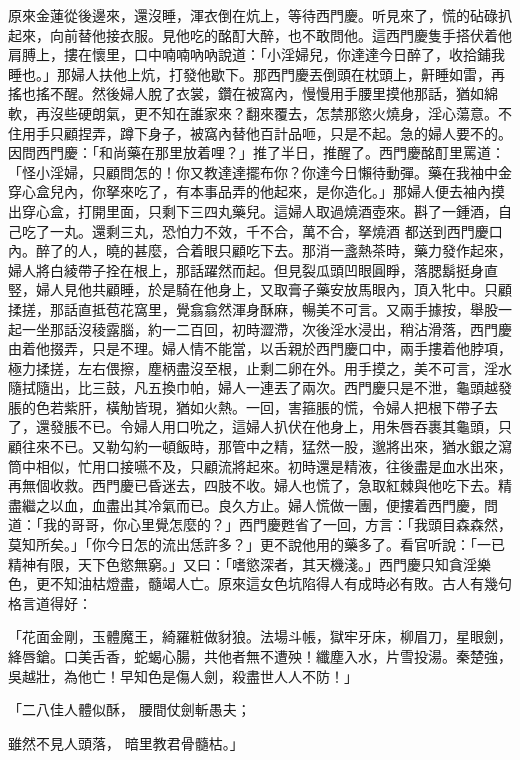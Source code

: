 \begin{showcontents}{}
原來金蓮從後邊來，還沒睡，渾衣倒在炕上，等待西門慶。听見來了，慌的砧碌扒起來，向前替他接衣服。見他吃的酩酊大醉，也不敢問他。這西門慶隻手搭伏着他肩膊上，摟在懷里，口中喃喃吶吶說道：「小淫婦兒，你達達今日醉了，收拾鋪我睡也。」那婦人扶他上炕，打發他歇下。那西門慶丟倒頭在枕頭上，鼾睡如雷，再搖也搖不醒。然後婦人脫了衣裳，鑽在被窩內，慢慢用手腰里摸他那話，猶如綿軟，再沒些硬朗氣，更不知在誰家來？翻來覆去，怎禁那慾火燒身，淫心蕩意。不住用手只顧捏弄，蹲下身子，被窩內替他百計品咂，只是不起。急的婦人要不的。因問西門慶：「和尚藥在那里放着哩？」推了半日，推醒了。西門慶酩酊里罵道：「怪小淫婦，只顧問怎的！你又教達達擺布你？你達今日懶待動彈。藥在我袖中金穿心盒兒內，你拏來吃了，有本事品弄的他起來，是你造化。」那婦人便去袖內摸出穿心盒，打開里面，只剩下三四丸藥兒。這婦人取過燒酒壺來。斟了一鍾酒，自己吃了一丸。還剩三丸，恐怕力不效，千不合，萬不合，拏燒酒 都送到西門慶口內。醉了的人，曉的甚麼，合着眼只顧吃下去。那消一盞熱茶時，藥力發作起來，婦人將白綾帶子拴在根上，那話躍然而起。但見裂瓜頭凹眼圓睜，落腮鬍挺身直竪，婦人見他共顧睡，於是騎在他身上，又取膏子藥安放馬眼內，頂入牝中。只顧揉搓，那話直抵苞花窩里，覺翕翕然渾身酥麻，暢美不可言。又兩手據按，舉股一起一坐那話沒稜露腦，約一二百回，初時澀滯，次後淫水浸出，稍沾滑落，西門慶由着他掇弄，只是不理。婦人情不能當，以舌親於西門慶口中，兩手摟着他脖項，極力揉搓，左右偎擦，塵柄盡沒至根，止剩二卵在外。用手摸之，美不可言，淫水隨拭隨出，比三鼓，凡五換巾帕，婦人一連丟了兩次。西門慶只是不泄，龜頭越發脹的色若紫肝，橫觔皆現，猶如火熱。一回，害箍脹的慌，令婦人把根下帶子去了，還發脹不已。令婦人用口吮之，這婦人扒伏在他身上，用朱唇吞裹其龜頭，只顧往來不已。又勒勾約一頓飯時，那管中之精，猛然一股，邈將出來，猶水銀之瀉筒中相似，忙用口接嚥不及，只顧流將起來。初時還是精液，往後盡是血水出來，再無個收救。西門慶已昏迷去，四肢不收。婦人也慌了，急取紅棘與他吃下去。精盡繼之以血，血盡出其冷氣而已。良久方止。婦人慌做一團，便摟着西門慶，問道：「我的哥哥，你心里覺怎麼的？」西門慶甦省了一回，方言：「我頭目森森然，莫知所矣。」「你今日怎的流出恁許多？」更不說他用的藥多了。看官听說：「一已精神有限，天下色慾無窮。」又曰：「嗜慾深者，其天機淺。」西門慶只知貪淫樂色，更不知油枯燈盡，髓竭人亡。原來這女色坑陷得人有成時必有敗。古人有幾句格言道得好：

「花面金剛，玉體魔王，綺羅粧做豺狼。法場斗帳，獄牢牙床，柳眉刀，星眼劍，絳唇鎗。口美舌香，蛇蝎心腸，共他者無不遭殃！纖塵入水，片雪投湯。秦楚強，吳越壯，為他亡！早知色是傷人劍，殺盡世人人不防！」

「二八佳人體似酥，  腰間仗劍斬愚夫；

雖然不見人頭落，  暗里教君骨髓枯。」


\end{showcontents}
